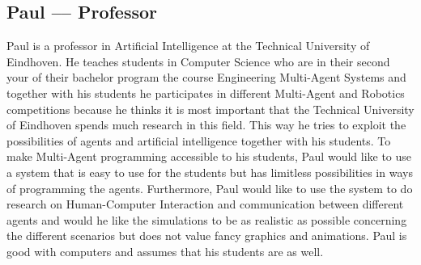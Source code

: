 \subsection{Paul –-- Professor}
Paul is a professor in Artificial Intelligence at the Technical University of Eindhoven. He teaches students in Computer Science who are in their second your of their bachelor program the course Engineering Multi-Agent Systems and together with his students he participates in different Multi-Agent and Robotics competitions because he thinks it is most important that the Technical University of Eindhoven spends much research in this field. This way he tries to exploit the possibilities of agents and artificial intelligence together with his students. 
To make Multi-Agent programming accessible to his students, Paul would like to use a system that is easy to use for the students but has limitless possibilities in ways of programming the agents. Furthermore, Paul would like to use the system to do research on Human-Computer Interaction and communication between different agents and would he like the simulations to be as realistic as possible concerning the different scenarios but does not value fancy graphics and animations. Paul is good with computers and assumes that his students are as well. 
